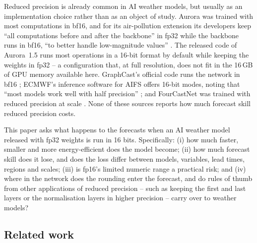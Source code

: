 Reduced precision is already common in AI weather models, but usually
as an implementation choice rather than as an object of study. Aurora
was trained with most computations in bf16, and for its air-pollution
extension its developers keep ``all computations before and after the
backbone'' in fp32 while the backbone runs in bf16, ``to better handle
low-magnitude values'' \citep{bodnar2024aurora}. The released code of
Aurora~1.5 runs most operations in a 16-bit format by default while
keeping the weights in fp32 -- a configuration that, at full
resolution, does not fit in the 16\,GB of GPU memory available here.
GraphCast's official code runs the network in bf16
\citep{lam2023graphcast, deepmind_weathernext_casting}; ECMWF's
inference software for AIFS offers 16-bit modes, noting that ``most
models work well with half precision'' \citep{anemoi_inference_precision};
and FourCastNet was trained with reduced precision at scale
\citep{kurth2023fourcastnet}. None of these sources reports how much
forecast skill reduced precision costs.

This paper asks what happens to the forecasts when an AI weather
model released with fp32 weights is run in 16 bits. Specifically: (i)
how much faster, smaller and more energy-efficient does the model
become; (ii) how much forecast skill does it lose, and does the loss
differ between models, variables, lead times, regions and scales; (iii)
is fp16's limited numeric range a practical risk; and (iv) where in the network
does the rounding enter the forecast, and do rules of thumb from other
applications of reduced precision -- such as keeping the first and last
layers or the normalisation layers in higher precision -- carry over to
weather models?

\subsection{Related work}
\label{sec:intro-related-work}

